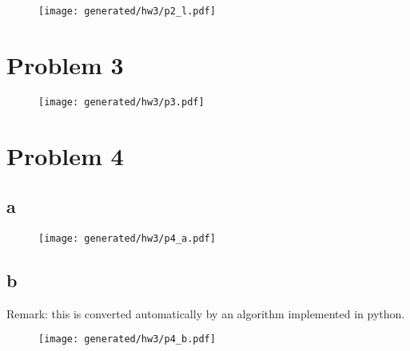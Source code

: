\begin{figure}[H]
    \centering
    \texttt{[image: generated/hw3/p2\_l.pdf]}
\end{figure}

\section{Problem 3}

\begin{figure}[H]
    \centering
    \texttt{[image: generated/hw3/p3.pdf]}
\end{figure}

\section{Problem 4}

\subsection{a}

\begin{figure}[H]
    \centering
    \texttt{[image: generated/hw3/p4\_a.pdf]}
\end{figure}

\subsection{b}

Remark: this is converted automatically by an algorithm implemented in python.

\begin{figure}[H]
    \centering
    \texttt{[image: generated/hw3/p4\_b.pdf]}
\end{figure}

